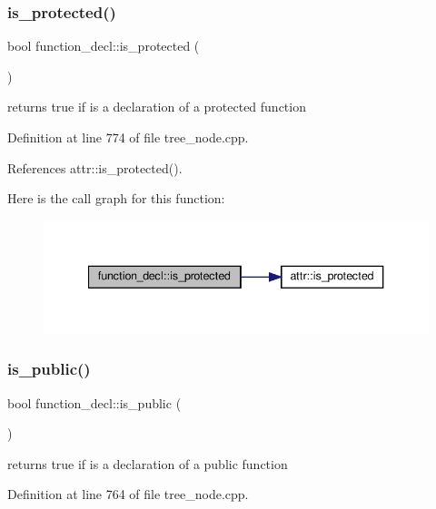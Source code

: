 \subsubsection{\texorpdfstring{is\+\_\+protected()}{is\_protected()}}
{\footnotesize\ttfamily bool function\+\_\+decl\+::is\+\_\+protected (\begin{DoxyParamCaption}{ }\end{DoxyParamCaption})}



returns true if is a declaration of a protected function 



Definition at line 774 of file tree\+\_\+node.\+cpp.



References attr\+::is\+\_\+protected().

Here is the call graph for this function\+:
\nopagebreak
\begin{figure}[H]
\begin{center}
\leavevmode
\includegraphics[width=340pt]{d0/d43/structfunction__decl_ad865eb7f91188526497ffe2857e3edb5_cgraph}
\end{center}
\end{figure}
\mbox{\label{structfunction__decl_a4358508e57432f8971ff434f1f03354b}} 
\subsubsection{\texorpdfstring{is\+\_\+public()}{is\_public()}}
{\footnotesize\ttfamily bool function\+\_\+decl\+::is\+\_\+public (\begin{DoxyParamCaption}{ }\end{DoxyParamCaption})}



returns true if is a declaration of a public function 



Definition at line 764 of file tree\+\_\+node.\+cpp.



